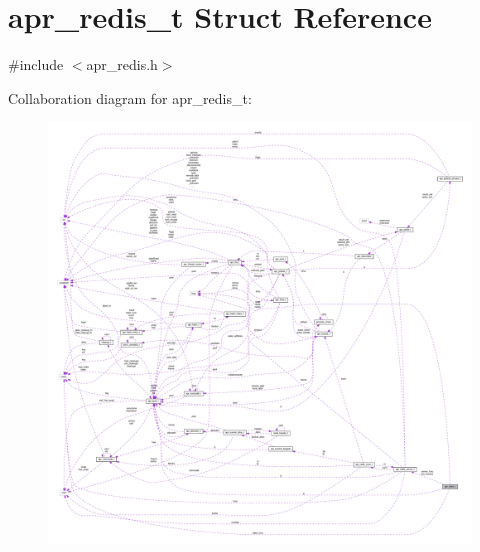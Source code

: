 \hypertarget{structapr__redis__t}{}\section{apr\+\_\+redis\+\_\+t Struct Reference}
\label{structapr__redis__t}


{\ttfamily \#include $<$apr\+\_\+redis.\+h$>$}



Collaboration diagram for apr\+\_\+redis\+\_\+t\+:
\nopagebreak
\begin{figure}[H]
\begin{center}
\leavevmode
\includegraphics[width=350pt]{structapr__redis__t__coll__graph}
\end{center}
\end{figure}

